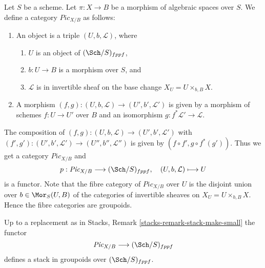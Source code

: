 \noindent
Let $S$ be a scheme.
Let $\pi : X \to B$ be a morphism of algebraic spaces over $S$.
We define a category $\textit{Pic}_{X/B}$ as follows:
\begin{enumerate}
\item An object is a triple $(U, b, \mathcal{L})$, where
\begin{enumerate}
\item $U$ is an object of $(\Sch/S)_{fppf}$,
\item $b : U \to B$ is a morphism over $S$, and
\item $\mathcal{L}$ is in invertible sheaf on the base change
$X_U = U \times_{b, B} X$.
\end{enumerate}
\item A morphism $(f, g) : (U, b, \mathcal{L}) \to (U', b', \mathcal{L}')$
is given by a morphism of schemes $f : U \to U'$ over $B$ and an
isomorphism $g : f^*\mathcal{L}' \to \mathcal{L}$.
\end{enumerate}
The composition of
$(f, g) : (U, b, \mathcal{L}) \to (U', b', \mathcal{L}')$
with
$(f', g') : (U', b', \mathcal{L}') \to (U'', b'', \mathcal{L}'')$
is given by $(f \circ f', g \circ f^*(g'))$.
Thus we get a category $\textit{Pic}_{X/B}$ and
$$
p : \textit{Pic}_{X/B} \longrightarrow (\Sch/S)_{fppf},
\quad
(U, b, \mathcal{L}) \longmapsto U
$$
is a functor. Note that the fibre category of $\textit{Pic}_{X/B}$ over $U$
is the disjoint union over $b \in \Mor_S(U, B)$ of the categories
of invertible sheaves on $X_U = U \times_{b, B} X$. Hence the fibre
categories are groupoids.

\begin{lemma}
\label{lemma-picard-stack}
Up to a replacement as in
Stacks, Remark \ref{stacks-remark-stack-make-small}
the functor
$$
\textit{Pic}_{X/B} \longrightarrow (\Sch/S)_{fppf}
$$
defines a stack in groupoids over $(\Sch/S)_{fppf}$.
\end{lemma}

